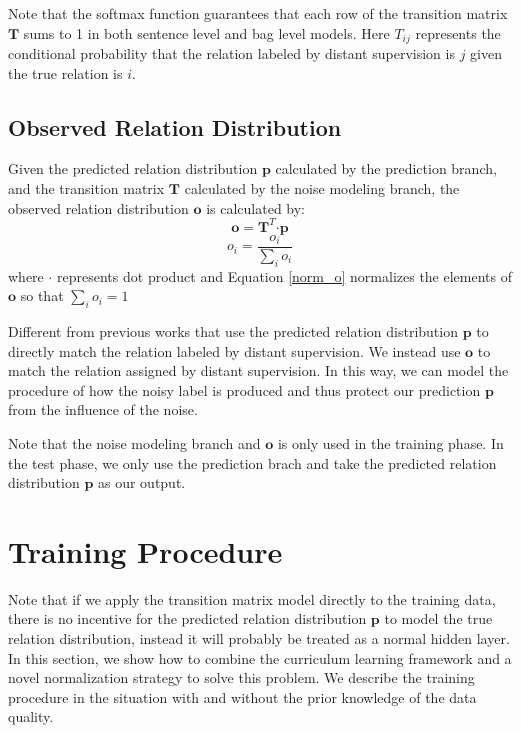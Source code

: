 \documentclass[11pt,a4paper]{article}
\begin{document}
Note that the softmax function guarantees that each row of the transition matrix $\mathbf{T}$ sums to 1 in both sentence level and bag level models. Here $T_{ij}$ represents the conditional probability that the relation labeled by distant supervision is $j$ given the true relation is $i$.


\subsection{Observed Relation Distribution}
Given the predicted relation distribution $\mathbf{p}$ calculated by the prediction branch, and the transition matrix $\mathbf{T}$ calculated by the noise modeling branch, the observed relation distribution $\mathbf{o}$ is calculated by:
 \begin{equation}
\mathbf{o} = \mathbf{T}^T \bm\cdot \mathbf{p}
 \end{equation}
 \begin{equation}
 \label{norm_o}
 o_i = \frac{o_i}{\sum_i{o_i}}
 \end{equation}
 where $\bm\cdot$ represents dot product and Equation \ref{norm_o} normalizes the elements of $\mathbf{o}$ so that $\sum_i{o_i}=1$
 
Different from previous works that use the predicted relation distribution $\mathbf{p}$ to directly match the relation labeled by distant supervision. We instead use $\mathbf{o}$ to match the relation assigned by distant supervision. In this way, we can model the procedure of how the noisy label is produced and thus protect our prediction $\mathbf{p}$ from the influence of the noise.

Note that the noise modeling branch and $\mathbf{o}$ is only used in the training phase. In the test phase, we only use the prediction brach and take the predicted relation distribution $\mathbf{p}$ as our output.

\section{Training Procedure} 
Note that if we apply the transition matrix model directly to the training data, there is no incentive for the predicted relation distribution $\mathbf{p}$ to model the true relation distribution, instead it will probably be treated as a normal hidden layer. In this section, we show how to combine the curriculum learning framework and a novel normalization strategy to solve this problem. We describe the training procedure in the situation with and without the prior knowledge of the data quality.
\end{document}
